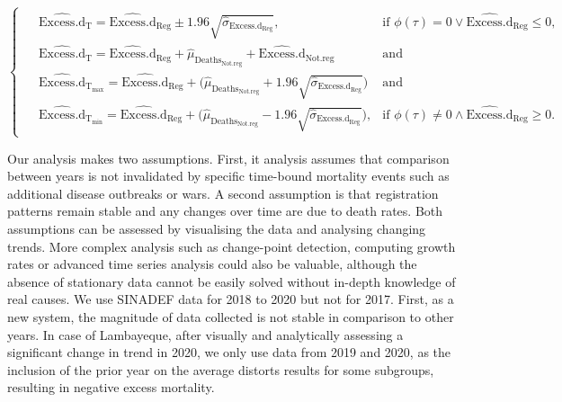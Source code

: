 \documentclass[
]{article}
\begin{document}
\begin{equation} \label{eq:14}
      \begin{cases}
      \!\begin{aligned}
        & \widehat{\text{Excess.d}}_\text{T}= \widehat{\text{Excess.d}}_\text{Reg} 
        \pm 1.96\sqrt{\hat{\sigma}_{\text{Excess.d}_\text{Reg}}},
        &\text{if }\phi(\tau)=0 \lor \widehat{\text{Excess.d}}_\text{Reg} \le 0,  \\%
        &\widehat{\text{Excess.d}}_\text{T} = \widehat{\text{Excess.d}}_\text{Reg}+\widehat{\mu}_{\text{Deaths}_\text{Not.reg}}+\widehat{\text{Excess.d}}_\text{Not.reg} 
        &\text{and }\\[1ex]
        &\widehat{\text{Excess.d}}_{\text{T}_\text{max}} = \widehat{\text{Excess.d}}_\text{Reg}+
        \Big( \widehat{\mu}_{\text{Deaths}_\text{Not.reg}}+
        1.96\sqrt{\hat{\sigma}_{\text{Excess.d}_\text{Reg}}} \Big)  &\text{and }\\[1ex]
              &\widehat{\text{Excess.d}}_{\text{T}_\text{min}} = \widehat{\text{Excess.d}}_\text{Reg}+
        \Big (\widehat{\mu}_{\text{Deaths}_\text{Not.reg}}-
        1.96\sqrt{\hat{\sigma}_{\text{Excess.d}_\text{Reg}}} \Big), &\text{if }\phi(\tau) \neq 0  \land \widehat{\text{Excess.d}}_\text{Reg} \geq 0.
    \end{aligned}
  \end{cases}
  \end{equation}

Our analysis makes two assumptions. First, it analysis assumes that comparison between years is not invalidated by specific time-bound mortality events such as additional disease outbreaks or wars. A second assumption is that registration patterns remain stable and any changes over time are due to death rates. Both assumptions can be assessed by visualising the data and analysing changing trends. More complex analysis such as change-point detection, computing growth rates or advanced time series analysis could also be valuable, although the absence of stationary data cannot be easily solved without in-depth knowledge of real causes.
We use SINADEF data for 2018 to 2020 but not for 2017. First, as a new system, the magnitude of data collected is not stable in comparison to other years. In case of Lambayeque, after visually and analytically assessing a significant change in trend in 2020, we only use data from 2019 and 2020, as the inclusion of the prior year on the average distorts results for some subgroups, resulting in negative excess mortality.
\end{document}
